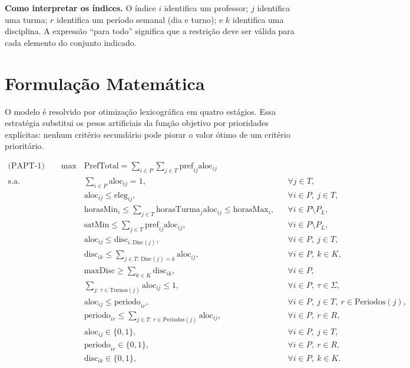 \documentclass[11pt,a4paper]{article}
\begin{document}
\noindent\textbf{Como interpretar os índices.} O índice $i$ identifica um professor; $j$ identifica uma turma; $r$ identifica um período semanal (dia e turno); e $k$ identifica uma disciplina. A expressão ``para todo'' significa que a restrição deve ser válida para cada elemento do conjunto indicado.

\section{Formulação Matemática}

O modelo é resolvido por otimização lexicográfica em quatro estágios. Essa estratégia substitui os pesos artificiais da função objetivo por prioridades explícitas: nenhum critério secundário pode piorar o valor ótimo de um critério prioritário.

\begin{align}
\text{(PAPT-1)} \qquad \max \quad
& \mathrm{PrefTotal}=\sum_{i\in P}\sum_{j\in T}\mathrm{pref}_{ij}\mathrm{aloc}_{ij} \label{eq:obj1}\\[3pt]
\text{s.a.}\quad
& \sum_{i\in P}\mathrm{aloc}_{ij}=1, && \forall j\in T, \label{eq:cobertura}\\
& \mathrm{aloc}_{ij}\leq \mathrm{eleg}_{ij}, && \forall i\in P,\ j\in T, \label{eq:elegibilidade}\\
& \mathrm{horasMin}_{i}\leq\sum_{j\in T}\mathrm{horasTurma}_{j}\mathrm{aloc}_{ij}\leq \mathrm{horasMax}_{i},
&& \forall i\in P\setminus P_L, \label{eq:capacidade}\\
& \mathrm{satMin}\leq\sum_{j\in T}\mathrm{pref}_{ij}\mathrm{aloc}_{ij},
&& \forall i\in P\setminus P_L, \label{eq:piso_satisfacao}\\
& \mathrm{aloc}_{ij}\leq \mathrm{disc}_{i,\mathrm{Disc}(j)}, && \forall i\in P,\ j\in T, \label{eq:liga_disciplina}\\
& \mathrm{disc}_{ik}\leq\sum_{j\in T:\,\mathrm{Disc}(j)=k}\mathrm{aloc}_{ij},
&& \forall i\in P,\ k\in K, \label{eq:liga_disciplina_reversa}\\
& \mathrm{maxDisc}\geq\sum_{k\in K}\mathrm{disc}_{ik}, && \forall i\in P, \label{eq:teto_disciplinas}\\
& \sum_{j:\,\tau\in\mathrm{Turnos}(j)}\mathrm{aloc}_{ij}\leq1,
&& \forall i\in P,\ \tau\in\Sigma, \label{eq:conflito}\\
& \mathrm{aloc}_{ij}\leq \mathrm{periodo}_{ir},
&& \forall i\in P,\ j\in T,\ r\in\mathrm{Periodos}(j), \label{eq:compactacao}\\
& \mathrm{periodo}_{ir}\leq\sum_{j\in T:\,r\in\mathrm{Periodos}(j)}\mathrm{aloc}_{ij},
&& \forall i\in P,\ r\in R, \label{eq:compactacao_reversa}\\
& \mathrm{aloc}_{ij}\in\{0,1\}, && \forall i\in P,\ j\in T, \label{eq:dom_x}\\
& \mathrm{periodo}_{ir}\in\{0,1\}, && \forall i\in P,\ r\in R, \label{eq:dom_z}\\
& \mathrm{disc}_{ik}\in\{0,1\}, && \forall i\in P,\ k\in K. \label{eq:dom_g}
\end{align}
\end{document}
